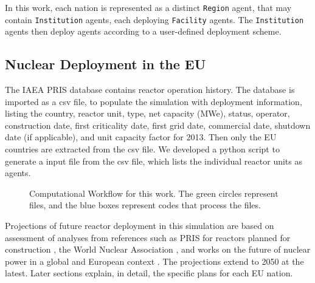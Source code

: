 In this work, each nation is represented as a distinct \texttt{Region} agent,
that may contain \texttt{Institution} agents, each deploying  \texttt{Facility} 
agents. The \texttt{Institution} agents then deploy agents according to 
a user-defined deployment scheme.


\subsection{Nuclear Deployment in the \gls{EU}}


The \gls{IAEA} \gls{PRIS} database \cite{iaea_pris_2017} contains reactor
operation history.
The database is imported as a csv file, to populate the simulation
with deployment information, listing the country, reactor unit, type, net capacity (\gls{MWe}), status,
operator, construction date, first criticality date, first grid date, commercial date, shutdown
date (if applicable), and unit capacity factor for 2013. Then only the \gls{EU} countries are extracted
from the csv file. We developed a python script to generate a \Cyclus input file from the csv file,
which lists the individual reactor units as agents. 


\begin{figure}
        \centering
\caption{Computational Workflow for this work. The green circles represent files, and the blue
         boxes represent codes that process the files.}
\label{diag:comp}
\end{figure}


Projections of future reactor deployment in this simulation are based on
assessment of analyses from references such as \gls{PRIS} for reactors planned
for construction \cite{iaea_pris_2017}, the World Nuclear Association
\cite{world_nuclear_association_nuclear_2017}, and works on the future of
nuclear power in a global \cite{joskow_future_2012} and European context
\cite{hatch_politics_2015}.  The projections extend to 2050 at the latest.  Later sections explain, in detail, the specific plans for each \gls{EU} nation.

